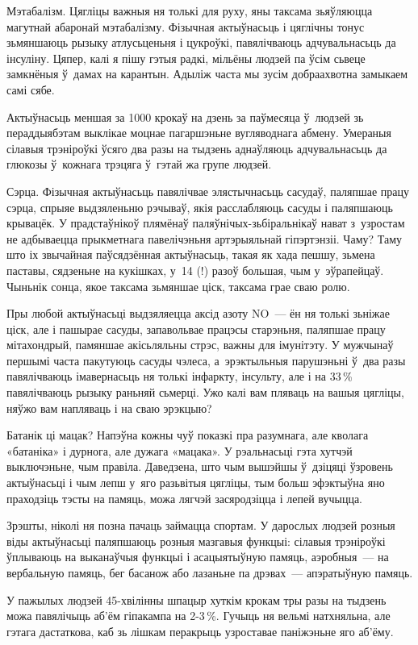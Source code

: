 Мэтабалізм. Цягліцы важныя ня толькі для руху, яны таксама зьяўляюцца магутнай абаронай мэтабалізму. Фізычная актыўнасьць і цяглічны тонус зьмяншаюць рызыку атлусьценьня і цукроўкі, павялічваюць адчувальнасьць да інсуліну. Цяпер, калі я пішу гэтыя радкі, мільёны людзей па ўсім сьвеце замкнёныя ў~дамах на карантын. Адыліж часта мы зусім добраахвотна замыкаем самі сябе.

Актыўнасьць меншая за 1000 крокаў на дзень за паўмесяца ў~людзей зь пераддыябэтам выклікае моцнае пагаршэньне вугляводнага абмену. Умераныя сілавыя трэніроўкі ўсяго два разы на тыдзень аднаўляюць адчувальнасьць да глюкозы ў~кожнага трэцяга ў~гэтай жа групе людзей.

Сэрца. Фізычная актыўнасьць павялічвае элястычнасьць сасудаў, паляпшае працу сэрца, спрыяе выдзяленьню рэчываў, якія расслабляюць сасуды і паляпшаюць крывацёк. У прадстаўнікоў плямёнаў паляўнічых-зьбіральнікаў нават з~узростам не адбываецца прыкметнага павелічэньня артэрыяльнай гіпэртэнзіі. Чаму? Таму што іх звычайная паўсядзённая актыўнасьць, такая як хада пешшу, зьмена паставы, сядзеньне на кукішках, у~14 (!) разоў большая, чым у~эўрапейцаў. Чыньнік сонца, якое таксама зьмяншае ціск, таксама грае сваю ролю.

Пры любой актыўнасьці выдзяляецца аксід азоту NO~--- ён ня толькі зьніжае ціск, але і пашырае сасуды, запавольвае працэсы старэньня, паляпшае працу мітахондрый, памяншае акісьляльны стрэс, важны для імунітэту. У мужчынаў першымі часта пакутуюць сасуды чэлеса, а~эрэктыльныя парушэньні ў~два разы павялічваюць імавернасьць ня толькі інфаркту, інсульту, але і на 33\,\% павялічваюць рызыку раньняй сьмерці. Ужо калі вам пляваць на вашыя цягліцы, няўжо вам напляваць і на сваю эрэкцыю?

Батанік ці мацак? Напэўна кожны чуў показкі пра разумнага, але кволага «батаніка» і дурнога, але дужага «мацака». У рэальнасьці гэта хутчэй выключэньне, чым правіла. Даведзена, што чым вышэйшы ў~дзіцяці ўзровень актыўнасьці і чым лепш у~яго разьвітыя цягліцы, тым больш эфэктыўна яно праходзіць тэсты на памяць, можа лягчэй засяродзіцца і лепей вучыцца.

Зрэшты, ніколі ня позна пачаць займацца спортам. У дарослых людзей розныя віды актыўнасьці паляпшаюць розныя мазгавыя функцыі: сілавыя трэніроўкі ўплываюць на выканаўчыя функцыі і асацыятыўную памяць, аэробныя~--- на вербальную памяць, бег басанож або лазаньне па дрэвах~--- апэратыўную памяць.

У пажылых людзей 45-хвілінны шпацыр хуткім крокам тры разы на тыдзень можа павялічыць аб'ём гіпакампа на 2-3\,\%. Гучыць ня вельмі натхняльна, але гэтага дастаткова, каб зь лішкам перакрыць узроставае паніжэньне яго аб'ёму.

